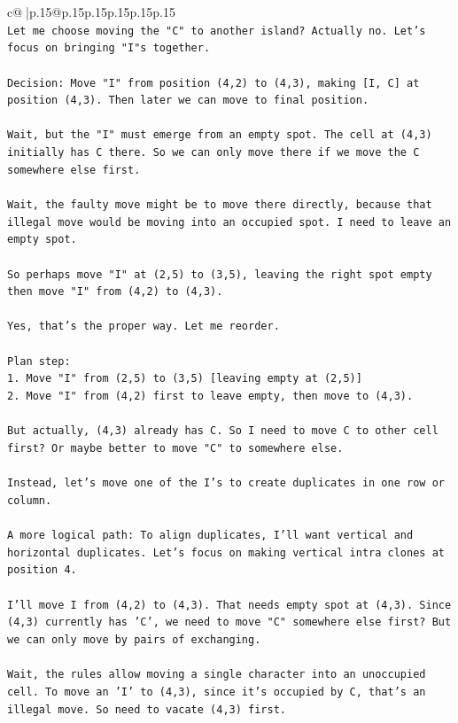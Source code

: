 \documentclass{article}
\begin{document}
{\begin{supertabular}{c@{$\;$}|p{.15\linewidth}@{}p{.15\linewidth}p{.15\linewidth}p{.15\linewidth}p{.15\linewidth}p{.15\linewidth}}
{{{\\ 
\texttt{Let me choose moving the "C" to another island? Actually no. Let's focus on bringing "I"s together.} \\
\\ 
\texttt{Decision: Move "I" from position (4,2) to (4,3), making {[}I, C{]} at position (4,3). Then later we can move to final position.} \\
\\ 
\texttt{Wait, but the "I" must emerge from an empty spot. The cell at (4,3) initially has C there. So we can only move there if we move the C somewhere else first.} \\
\\ 
\texttt{Wait, the faulty move might be to move there directly, because that illegal move would be moving into an occupied spot. I need to leave an empty spot.} \\
\\ 
\texttt{So perhaps move "I" at (2,5) to (3,5), leaving the right spot empty then move "I" from (4,2) to (4,3).} \\
\\ 
\texttt{Yes, that's the proper way. Let me reorder.} \\
\\ 
\texttt{Plan step:} \\
\texttt{1. Move "I" from (2,5) to (3,5) {[}leaving empty at (2,5){]}} \\
\texttt{2. Move "I" from (4,2) first to leave empty, then move to (4,3).} \\
\\ 
\texttt{But actually, (4,3) already has C. So I need to move C to other cell first? Or maybe better to move "C" to somewhere else.} \\
\\ 
\texttt{Instead, let's move one of the I's to create duplicates in one row or column.} \\
\\ 
\texttt{A more logical path: To align duplicates, I'll want vertical and horizontal duplicates. Let's focus on making vertical intra clones at position 4.} \\
\\ 
\texttt{I'll move I from (4,2) to (4,3). That needs empty spot at (4,3). Since (4,3) currently has 'C', we need to move "C" somewhere else first? But we can only move by pairs of exchanging.} \\
\\ 
\texttt{Wait, the rules allow moving a single character into an unoccupied cell. To move an 'I' to (4,3), since it's occupied by C, that's an illegal move. So need to vacate (4,3) first.} \\
}}}
\end{supertabular}}
\end{document}

